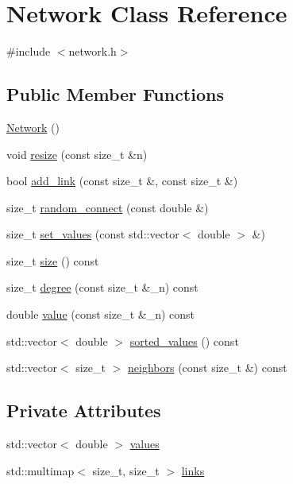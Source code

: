 \hypertarget{classNetwork}{}\section{Network Class Reference}
\label{classNetwork}


{\ttfamily \#include $<$network.\+h$>$}

\subsection*{Public Member Functions}
\begin{DoxyCompactItemize}
\item 
\mbox{\hyperlink{classNetwork_a3cc2fb4f8fa4d507077e8da85ce5a1c8}{Network}} ()
\item 
void \mbox{\hyperlink{classNetwork_acbc93883d63221b1204055d7192c74e3}{resize}} (const size\+\_\+t \&n)
\item 
bool \mbox{\hyperlink{classNetwork_a2bc02af56e866adf0c55a2c49885551a}{add\+\_\+link}} (const size\+\_\+t \&, const size\+\_\+t \&)
\item 
size\+\_\+t \mbox{\hyperlink{classNetwork_aab69fcd3971532b165c4a4ff7df4b81c}{random\+\_\+connect}} (const double \&)
\item 
size\+\_\+t \mbox{\hyperlink{classNetwork_aee0b1927ab5693cf90a00fe4d505c427}{set\+\_\+values}} (const std\+::vector$<$ double $>$ \&)
\item 
size\+\_\+t \mbox{\hyperlink{classNetwork_a41c54d12d861883170b5c5abca3a7bc8}{size}} () const
\item 
size\+\_\+t \mbox{\hyperlink{classNetwork_a7bd299baab15f2652fa697b1afde3977}{degree}} (const size\+\_\+t \&\+\_\+n) const
\item 
double \mbox{\hyperlink{classNetwork_a9b9cb94c0af24ce5417d840727fb5ad3}{value}} (const size\+\_\+t \&\+\_\+n) const
\item 
std\+::vector$<$ double $>$ \mbox{\hyperlink{classNetwork_a9f79d1f7ffd359d879f647da3eaf95b3}{sorted\+\_\+values}} () const
\item 
std\+::vector$<$ size\+\_\+t $>$ \mbox{\hyperlink{classNetwork_a6b590aa55ca6e568d209f7c90fbb514e}{neighbors}} (const size\+\_\+t \&) const
\end{DoxyCompactItemize}
\subsection*{Private Attributes}
\begin{DoxyCompactItemize}
\item 
std\+::vector$<$ double $>$ \mbox{\hyperlink{classNetwork_ab4062dd3b2fc7825f21a686d76e3c696}{values}}
\item 
std\+::multimap$<$ size\+\_\+t, size\+\_\+t $>$ \mbox{\hyperlink{classNetwork_a1b5fbd7815319e330841dbd961d9f8cc}{links}}
\end{DoxyCompactItemize}



